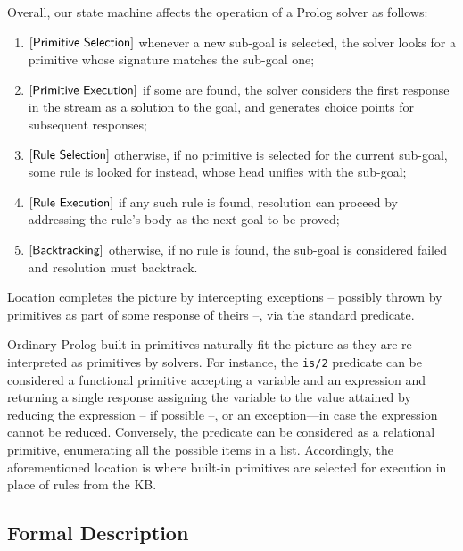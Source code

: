 \documentclass[12pt,a4paper,openright,twoside]{book}
\begin{document}
Overall, our state machine affects the operation of a Prolog solver as follows:
%
\begin{enumerate}
    \item $\left[\textsf{Primitive Selection}\right]$ whenever a new sub-goal is selected, the solver looks for a primitive whose signature matches the sub-goal one;

    \item $\left[\textsf{Primitive Execution}\right]$ if some are found, the solver considers the first response in the stream as a solution to the goal, and generates choice points for subsequent responses;

    \item $\left[\textsf{Rule Selection}\right]$ otherwise, if no primitive is selected for the current sub-goal, some rule is looked for instead, whose head unifies with the sub-goal;

    \item $\left[\textsf{Rule Execution}\right]$ if any such rule is found, resolution can proceed by addressing the rule's body as the next goal to be proved;

    \item $\left[\textsf{Backtracking}\right]$ otherwise, if no rule is found, the sub-goal is considered failed and resolution must backtrack.
\end{enumerate}
%
Location  completes the picture by intercepting exceptions -- possibly thrown by primitives as part of some response of theirs --, via the standard  predicate.

Ordinary Prolog built-in primitives naturally fit the picture as they are re-interpreted as  primitives by solvers.
%
For instance, the \texttt{is/2} predicate can be considered a functional primitive accepting a variable and an expression and returning a single response assigning the variable to the value attained by reducing the expression -- if possible --, or an exception---in case the expression cannot be reduced.
%
Conversely, the  predicate can be considered as a relational primitive, enumerating all the possible items in a list.
%
Accordingly, the aforementioned  location is where built-in primitives are selected for execution in place of rules from the KB.

\subsection{Formal Description}
\end{document}
